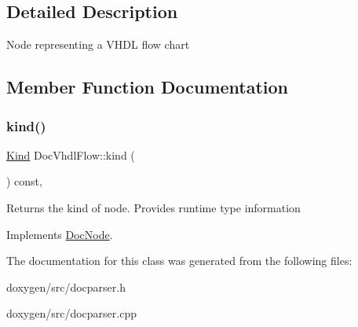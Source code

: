 \subsection{Detailed Description}
Node representing a V\+H\+DL flow chart 

\subsection{Member Function Documentation}
\mbox{\label{class_doc_vhdl_flow_a7171876a9227269a77abb93ce34b00d0}} 
\subsubsection{\texorpdfstring{kind()}{kind()}}
{\footnotesize\ttfamily \mbox{\hyperlink{class_doc_node_aebd16e89ca590d84cbd40543ea5faadb}{Kind}} Doc\+Vhdl\+Flow\+::kind (\begin{DoxyParamCaption}{ }\end{DoxyParamCaption}) const\hspace{0.3cm}{\ttfamily [inline]}, {\ttfamily [virtual]}}

Returns the kind of node. Provides runtime type information 

Implements \mbox{\hyperlink{class_doc_node_a108ffd214a72ba6e93dac084a8f58049}{Doc\+Node}}.



The documentation for this class was generated from the following files\+:\begin{DoxyCompactItemize}
\item 
doxygen/src/docparser.\+h\item 
doxygen/src/docparser.\+cpp\end{DoxyCompactItemize}
